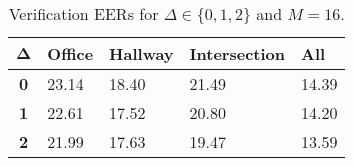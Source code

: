 \begin{table}[h]
    \centering
    \begin{tabular}{|c|M{2cm}|M{2cm}|M{2cm}|M{2cm}|}
    \hline
    $\boldsymbol{\Delta}$ & \bf{Office} & \bf{Hallway} & \bf{Intersection} & \bf{All} \\ 
    \hline 
    \hline
    \bf{0} & 23.14 & 18.40 & 21.49 & 14.39 \\
    \hline
    \bf{1} & 22.61 & 17.52 & 20.80 & 14.20 \\
    \hline
    \bf{2} & 21.99 & 17.63 & 19.47 & 13.59 \\
    \hline
    \end{tabular}
    \caption{Verification EERs for $\Delta \in \{0, 1, 2\}$ and $M = 16$.}
    \label{tab:verify_adapted_m_M_16}
\end{table}
